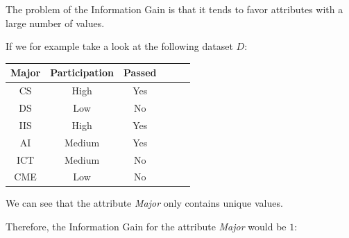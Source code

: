 \documentclass[
english,
smallborders
]{i6prcsht}
\begin{document}
\begin{solution}	
	The problem of the Information Gain is that it tends to favor attributes with a large number of values.
	
	If we for example take a look at the following dataset $D$:
	
	\begin{center}	
		\begin{tabular}{|c|c|c|c|c|c|}
			\hline
			\textbf{Major} & \textbf{Participation} & \textbf{Passed} \\ \hline
			CS             & High                   & Yes             \\ \hline
			DS             & Low                    & No              \\ \hline
			IIS            & High                   & Yes             \\ \hline
			AI             & Medium                 & Yes             \\ \hline
			ICT            & Medium                 & No              \\ \hline
			CME            & Low                    & No              \\ \hline
		\end{tabular}
	\end{center}
	
	We can see that the attribute \textit{Major} only contains unique values.
	
	Therefore, the Information Gain for the attribute \textit{Major} would be $1$:
	

\end{solution}
\end{document}
